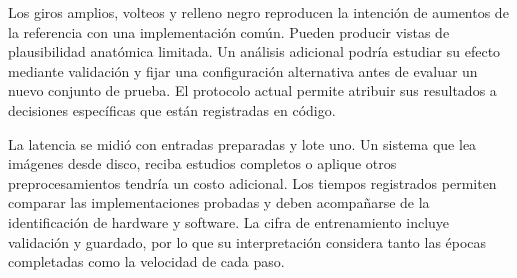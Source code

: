 Los giros amplios, volteos y relleno negro reproducen la intención de aumentos de la referencia con una implementación común. Pueden producir vistas de plausibilidad anatómica limitada. Un análisis adicional podría estudiar su efecto mediante validación y fijar una configuración alternativa antes de evaluar un nuevo conjunto de prueba. El protocolo actual permite atribuir sus resultados a decisiones específicas que están registradas en código.

La latencia se midió con entradas preparadas y lote uno. Un sistema que lea imágenes desde disco, reciba estudios completos o aplique otros preprocesamientos tendría un costo adicional. Los tiempos registrados permiten comparar las implementaciones probadas y deben acompañarse de la identificación de hardware y software. La cifra de entrenamiento incluye validación y guardado, por lo que su interpretación considera tanto las épocas completadas como la velocidad de cada paso.
